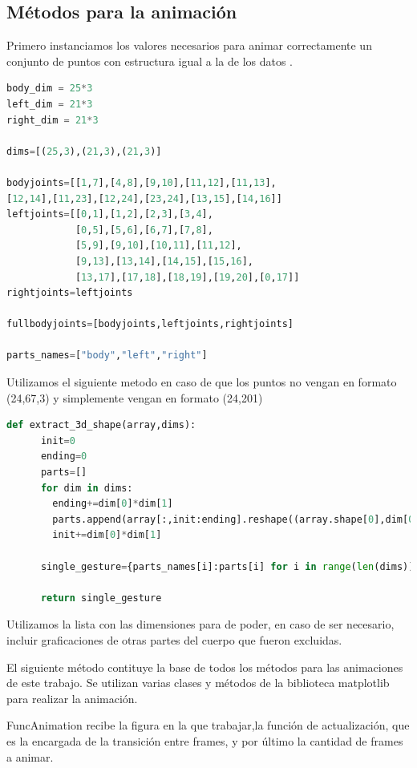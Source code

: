 \subsection{Métodos para la animación}
Primero instanciamos los valores necesarios para animar correctamente un conjunto de puntos con estructura igual a la de los datos .

\begin{lstlisting}[language=Python, caption={Instanciar datos necesarios para animar }]
body_dim = 25*3
left_dim = 21*3
right_dim = 21*3

dims=[(25,3),(21,3),(21,3)]

bodyjoints=[[1,7],[4,8],[9,10],[11,12],[11,13],
[12,14],[11,23],[12,24],[23,24],[13,15],[14,16]]
leftjoints=[[0,1],[1,2],[2,3],[3,4],
            [0,5],[5,6],[6,7],[7,8],
            [5,9],[9,10],[10,11],[11,12],
            [9,13],[13,14],[14,15],[15,16],
            [13,17],[17,18],[18,19],[19,20],[0,17]]
rightjoints=leftjoints

fullbodyjoints=[bodyjoints,leftjoints,rightjoints]

parts_names=["body","left","right"]
\end{lstlisting}

Utilizamos el siguiente metodo en caso de que los puntos no vengan en formato (24,67,3) y simplemente vengan en formato (24,201)

\begin{lstlisting}[language=Python, caption={Extraer las partes en 3d }]
def extract_3d_shape(array,dims):
      init=0
      ending=0
      parts=[]
      for dim in dims:
        ending+=dim[0]*dim[1]
        parts.append(array[:,init:ending].reshape((array.shape[0],dim[0],dim[1])))
        init+=dim[0]*dim[1]

      single_gesture={parts_names[i]:parts[i] for i in range(len(dims))}

      return single_gesture
\end{lstlisting}

Utilizamos la lista con las dimensiones para de poder, en caso de ser necesario, incluir graficaciones de otras partes del cuerpo que fueron excluidas.

El siguiente método contituye la base de todos los métodos para las animaciones de este trabajo.
Se utilizan varias clases y métodos de la biblioteca matplotlib para realizar la animación.

FuncAnimation recibe la figura en la que trabajar,la función de actualización, que es la encargada de la transición entre frames, y por último la cantidad de frames a animar.

